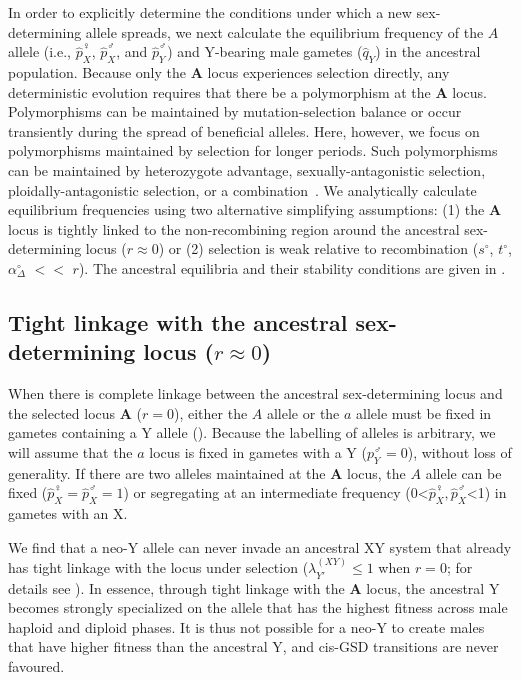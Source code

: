 \documentclass[10pt,letterpaper]{article}
\begin{document}
In order to explicitly determine the conditions under which a new sex-determining allele spreads, we next calculate the equilibrium frequency of the $A$ allele (i.e., $\hat{p}^\female_X$, $\hat{p}^\male_X$, and $\hat{p}^\male_Y$) and Y-bearing male gametes ($\hat{q}_{Y}$) in the ancestral population. 
Because only the $\mathbf{A}$ locus experiences selection directly, any deterministic evolution requires that there be a polymorphism at the $\mathbf{A}$ locus. 
Polymorphisms can be maintained by mutation-selection balance or occur transiently during the spread of beneficial alleles. 
Here, however, we focus on polymorphisms maintained by selection for longer periods. 
Such polymorphisms can be maintained by heterozygote advantage, sexually-antagonistic selection, ploidally-antagonistic selection, or a combination~\cite{Immler:2012tl}.
We analytically calculate equilibrium frequencies using two alternative simplifying assumptions: 
(1) the $\mathbf{A}$ locus is tightly linked to the non-recombining region around the ancestral sex-determining locus ($r \approx 0$) or (2) selection is weak relative to recombination ($s^\circ$, $t^\circ$, $\alpha_{\Delta}^\circ$ $<<$ $r$).
The ancestral equilibria and their stability conditions are given in . 

\subsection*{Tight linkage with the ancestral sex-determining locus ($r \approx 0$)}

When there is complete linkage between the ancestral sex-determining locus and the selected locus $\mathbf{A}$ ($r=0$), either the $A$ allele or the $a$ allele must be fixed in gametes containing a Y allele (). 
Because the labelling of alleles is arbitrary, we will assume that the $a$ locus is fixed in gametes with a Y ($p^\male_Y=0$), without loss of generality. 
If there are two alleles maintained at the $\mathbf{A}$ locus, the $A$ allele can be fixed ($\hat{p}^\female_X=\hat{p}^\male_X=1$) or segregating at an intermediate frequency (0<$\hat{p}^\female_X, \hat{p}^\male_X$<1) in gametes with an X. 

We find that a neo-Y allele can never invade an ancestral XY system that already has tight linkage with the locus under selection ($\lambda_{Y'}^{(XY)} \leq 1$ when $r=0$; for details see ). 
In essence, through tight linkage with the $\mathbf{A}$ locus, the ancestral Y becomes strongly specialized on the allele that has the highest fitness across male haploid and diploid phases. 
It is thus not possible for a neo-Y to create males that have higher fitness than the ancestral Y, and cis-GSD transitions are never favoured. 
\end{document}
